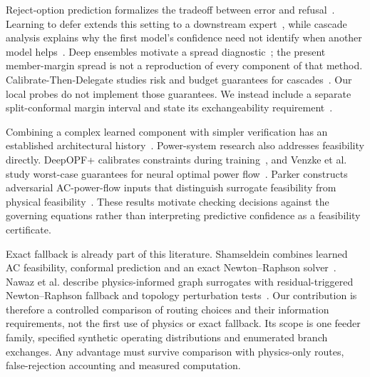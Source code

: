 Reject-option prediction formalizes the tradeoff between error and refusal~\cite{chow1970}. Learning to defer extends this setting to a downstream expert~\cite{mozannar2020}, while cascade analysis explains why the first model's confidence need not identify when another model helps~\cite{jitkrittum2023}. Deep ensembles motivate a spread diagnostic~\cite{lakshminarayanan2017}; the present member-margin spread is not a reproduction of every component of that method. Calibrate-Then-Delegate studies risk and budget guarantees for cascades~\cite{pona2026}. Our local probes do not implement those guarantees. We instead include a separate split-conformal margin interval and state its exchangeability requirement~\cite{angelopoulos2023}.

Combining a complex learned component with simpler verification has an established architectural history~\cite{sha2001}. Power-system research also addresses feasibility directly. DeepOPF+ calibrates constraints during training~\cite{zhao2020}, and Venzke et al. study worst-case guarantees for neural optimal power flow~\cite{venzke2020}. Parker constructs adversarial AC-power-flow inputs that distinguish surrogate feasibility from physical feasibility~\cite{parker2026}. These results motivate checking decisions against the governing equations rather than interpreting predictive confidence as a feasibility certificate.

Exact fallback is already part of this literature. Shamseldein combines learned AC feasibility, conformal prediction and an exact Newton--Raphson solver~\cite{shamseldein2026}. Nawaz et al. describe physics-informed graph surrogates with residual-triggered Newton--Raphson fallback and topology perturbation tests~\cite{nawaz2026}. Our contribution is therefore a controlled comparison of routing choices and their information requirements, not the first use of physics or exact fallback. Its scope is one feeder family, specified synthetic operating distributions and enumerated branch exchanges. Any advantage must survive comparison with physics-only routes, false-rejection accounting and measured computation.
